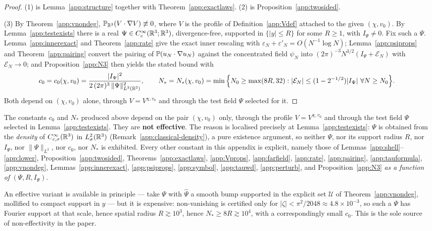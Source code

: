 \begin{proof}
(1) is Lemma~\ref{app:structure} together with
Theorem~\ref{app:exactlaws}. (2) is Proposition~\ref{app:twosided}.

(3) By Theorem~\ref{app:vnondeg}, $\mathbb P_{\mathbb R^3}(V\cdot\nabla V)\not\equiv0$,
where $V$ is the profile of Definition~\ref{app:Vdef} attached to the
given $(\chi,v_0)$. By Lemma~\ref{app:testexists} there is a real
$\Psi\in C^\infty_c(\mathbb R^3;\mathbb R^3)$, divergence-free, supported in
$\{|y|\le R\}$ for some $R\ge1$, with $I_\Psi\neq0$. Fix such a $\Psi$.
Lemma~\ref{app:innerexact} and Theorem~\ref{app:rate} give the exact
inner rescaling with $\varepsilon_N+\varepsilon'_N=O(N^{-1}\log N)$;
Lemma~\ref{app:psiprops} and Theorem~\ref{app:pairing} convert the
pairing of $\mathbb P(u_N\cdot\nabla u_N)$ against the concentrated field
$\psi_N$ into $(2\pi)^{-3}N^{3/2}(I_\Psi+\mathcal E_N)$ with
$\mathcal E_N\to0$; and Proposition~\ref{app:N3} then yields the stated
bound with
\[
c_0=c_0(\chi,v_0)=\frac{|I_\Psi|^{2}}
{2\,(2\pi)^{3}\,\|\Psi\|_{L^2(\mathbb R^3)}^{2}},
\qquad
N_*=N_*(\chi,v_0)
=\min\Big\{N_0\ge\max(8R,32):|\mathcal E_N|\le(1-2^{-1/2})|I_\Psi|
\ \forall N\ge N_0\Big\}.
\]
Both depend on $(\chi,v_0)$ alone, through $V=V^{\chi,v_0}$ and through
the test field $\Psi$ selected for it.
\end{proof}

\begin{remark}\label{app:noneffective}
The constants $c_0$ and $N_*$ produced above depend on the pair
$(\chi,v_0)$ only, through the profile $V=V^{\chi,v_0}$ and through the
test field $\Psi$ selected in Lemma~\ref{app:testexists}. They are
\textbf{not effective}. The reason is localised precisely at
Lemma~\ref{app:testexists}: $\Psi$ is obtained from the \emph{density}
of $C^\infty_{c,\sigma}(\mathbb R^3)$ in $L^2_\sigma(\mathbb R^3)$
(Remark~\ref{app:classical-density}), a pure existence argument, so
neither $\Psi$, nor its support radius $R$, nor $I_\Psi$, nor
$\|\Psi\|_{L^2}$, nor $c_0$, nor $N_*$ is exhibited. Every other
constant in this appendix is explicit, namely those of
Lemmas~\ref{app:shell}--\ref{app:lower},
Proposition~\ref{app:twosided}, Theorems~\ref{app:exactlaws},
\ref{app:Vprops}, \ref{app:farfield}, \ref{app:rate},
\ref{app:pairing}, \ref{app:tauformula}, \ref{app:vnondeg},
Lemmas~\ref{app:innerexact}, \ref{app:psiprops}, \ref{app:symbol},
\ref{app:tauwd}, \ref{app:perturb}, and Proposition~\ref{app:N3}
\emph{as a function of} $(\Psi,R,I_\Psi)$.

An effective variant is available in principle --- take $\Psi$ with
$\widehat\Psi$ a smooth bump supported in the explicit set $\mathcal U$
of Theorem~\ref{app:vnondeg}, mollified to compact support in $y$ ---
but it is expensive: non-vanishing is certified only for
$|\zeta|<\pi^2/2048\approx4.8\times10^{-3}$, so such a $\Psi$ has
Fourier support at that scale, hence spatial radius $R\gtrsim10^{3}$,
hence $N_*\ge8R\gtrsim10^{4}$, with a correspondingly small $c_0$. This
is the sole source of non-effectivity in the paper.
\end{remark}

